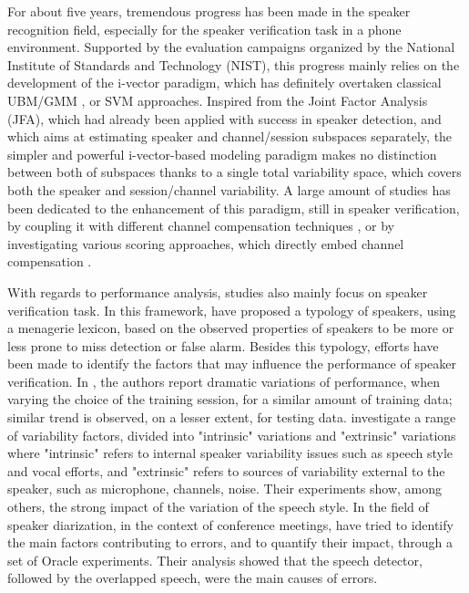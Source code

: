 For about five years, tremendous progress has been made in the speaker recognition field, especially for the speaker verification task in a phone environment. Supported by the evaluation campaigns organized by the National Institute of Standards and Technology (NIST)\cite{greenberg2013,greenberg2014}, this progress mainly relies on the development of the i-vector paradigm, which has definitely overtaken classical UBM/GMM \cite{bimbot2004}, or SVM \cite{wan2000} approaches. Inspired from the Joint Factor Analysis (JFA), which had already been applied with success in speaker detection, and which aims at estimating speaker and channel/session subspaces separately, the simpler and powerful i-vector-based modeling paradigm \cite{dehak2011} makes no distinction between both of subspaces thanks to a single total variability space, which covers both the speaker and session/channel variability. A large amount of studies has been dedicated to the enhancement of this paradigm, still in speaker verification, by coupling it with different channel compensation techniques \cite{dehak2011,bousquet2012,kanagasundaram2014}, or by investigating various scoring approaches, which directly embed channel compensation \cite{kenny2010,dehak2011,garcia2011,jiang2012,bousquet2014}. 

With regards to performance analysis, studies also mainly focus on speaker verification task.  In this framework, \cite{doddington98} have proposed a typology of speakers, using a menagerie lexicon, based on the observed properties of speakers to be more or less prone to miss detection or false alarm. Besides this typology, efforts have been made to identify the factors that may influence the performance of speaker verification. In \cite{kahn10}, the authors report dramatic variations of performance, when varying the choice of the training session, for a similar amount of training data; similar trend is observed, on a lesser extent, for testing data.  \cite{BESTanalysis} investigate a range of variability factors, divided into "intrinsic" variations and "extrinsic" variations where "intrinsic" refers to internal speaker variability issues such as speech style and vocal efforts, and "extrinsic" refers to sources of variability external to the speaker, such as microphone, channels, noise. Their experiments show, among others, the strong impact of the variation of the speech style.
In the field of speaker diarization, in the context of conference meetings, \cite{Huijbregts07theblame} have  tried to identify the main factors contributing to errors, and to quantify their impact, through a set of Oracle experiments. Their analysis showed that the speech detector, followed by the overlapped speech, were the main causes of errors.

